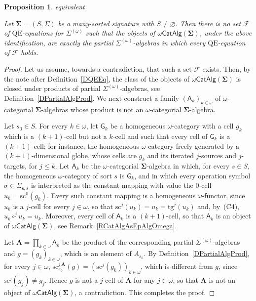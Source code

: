 \documentclass[a4paper, reqno]{amsbook}
\makeatletter
\newcommand{\sig}[1]{\mathbf{#1}}             %
\newcommand{\calg}[1]{\boldsymbol{\mathsf{#1}}} %
\newcommand{\QE}{\mathrm{QE}}
\newcommand{\src}{\mathrm{sc}}
\newcommand{\tgt}{\mathrm{tg}}
\theoremstyle{plain}
\newtheorem{proposition}[theorem]{Proposition}
\theoremstyle{definition}
\newcommand*{\CA@leanpending}{}
\newcommand*{\CA@leanrelation}{}
\newcommand*{\lean}[2]{%
  \ifcsname\string\color@lean@#1\endcsname\else
    \PackageError{main}{Unknown relation `#1' in \string\lean}{Use equivalent, weaker or stronger.}%
  \fi
  \gdef\CA@leanrelation{#1}%
  \gdef\CA@leanpending{#2}}
\makeatother
\begin{document}
\begin{proposition}\label{PFiniteDimNotQE}\lean{equivalent}{Homogeneous.not_qe_axiomatizable}
Let $\sig{\Sigma}=(S,\Sigma)$ be a many-sorted signature with $S\neq\varnothing$.
Then there is no set $\mathcal{F}$ of $\QE$-equations for $\Sigma^{(\omega)}$ such that the objects of $\omega\mathsf{CatAlg}(\sig{\Sigma})$, under the above identification, are exactly the partial $\Sigma^{(\omega)}$-algebras in which every $\QE$-equation of $\mathcal{F}$ holds.
\end{proposition}
\begin{proof}
Let us assume, towards a contradiction, that such a set $\mathcal{F}$ exists.
Then, by the note after Definition~\ref{DQEEq}, the class of the objects of $\omega\mathsf{CatAlg}(\sig{\Sigma})$ is closed under products of partial $\Sigma^{(\omega)}$-algebras, see Definition~\ref{DPartialAlgProd}.
We next construct a family $(\calg{A}_{k})_{k\in\omega}$ of $\omega$-categorial $\sig{\Sigma}$-algebras whose product is not an $\omega$-categorial $\sig{\Sigma}$-algebra.

Let $s_{0}\in S$.
For every $k\in\omega$, let $\mathsf{G}_{k}$ be a homogeneous $\omega$-category with a cell $g_{k}$ which is a $(k+1)$-cell but not a $k$-cell and such that every cell of $\mathsf{G}_{k}$ is a $(k+1)$-cell; for instance, the homogeneous $\omega$-category freely generated by a $(k+1)$-dimensional globe, whose cells are $g_{k}$ and its iterated $j$-sources and $j$-targets, for $j\leq k$.
Let $\calg{A}_{k}$ be the $\omega$-categorial $\sig{\Sigma}$-algebra in which, for every $s\in S$, the homogeneous $\omega$-category of sort $s$ is $\mathsf{G}_{k}$, and in which every operation symbol $\sigma\in\Sigma_{\mathbf{s},s}$ is interpreted as the constant mapping with value the $0$-cell $u_{k}=\src^{0}(g_{k})$.
Every such constant mapping is a homogeneous $\omega$-functor, since $u_{k}$ is a $j$-cell for every $j\in\omega$, so that $\src^{j}(u_{k})=u_{k}=\tgt^{j}(u_{k})$ and, by~(C4), $u_{k}\circ^{j}u_{k}=u_{k}$.
Moreover, every cell of $\calg{A}_{k}$ is a $(k+1)$-cell, so that $\calg{A}_{k}$ is an object of $\omega\mathsf{CatAlg}(\sig{\Sigma})$, see Remark~\ref{RCatAlgAsEpAlgOmega}.

Let $\mathbf{A}=\prod_{k\in\omega}\calg{A}_{k}$ be the product of the corresponding partial $\Sigma^{(\omega)}$-algebras and $g=(g_{k})_{k\in\omega}$, which is an element of $A_{s_{0}}$.
By Definition~\ref{DPartialAlgProd}, for every $j\in\omega$, $\src^{j\,\mathbf{A}}_{s_{0}}(g)=(\src^{j}(g_{k}))_{k\in\omega}$, which is different from $g$, since $\src^{j}(g_{j})\neq g_{j}$.
Hence $g$ is not a $j$-cell of $\mathbf{A}$ for any $j\in\omega$, so that $\mathbf{A}$ is not an object of $\omega\mathsf{CatAlg}(\sig{\Sigma})$, a contradiction. This completes the proof.
\end{proof}
\end{document}
